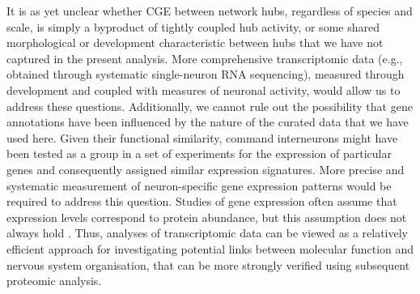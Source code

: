 {It is as yet unclear whether CGE between network hubs, regardless of species and scale, is simply a byproduct of tightly coupled hub activity, or some shared morphological or development characteristic between hubs that we have not captured in the present analysis.
More comprehensive transcriptomic data (e.g., obtained through systematic single-neuron RNA sequencing), measured through development and coupled with measures of neuronal activity, would allow us to address these questions.
Additionally, we cannot rule out the possibility that gene annotations have been influenced by the nature of the curated data that we have used here. Given their functional similarity, command interneurons might have been tested as a group in a set of experiments for the expression of particular genes and consequently assigned similar expression signatures.
More precise and systematic measurement of neuron-specific gene expression patterns would be required to address this question.
Studies of gene expression often assume that expression levels correspond to protein abundance, but this assumption does not always hold \citep{Futcher1999, Greenbaum2003, Gygi1999}.
Thus, analyses of transcriptomic data can be viewed as a relatively efficient approach for investigating potential links between molecular function and nervous system organisation, that can be more strongly verified using subsequent proteomic analysis.

}
